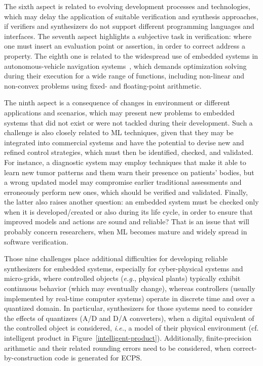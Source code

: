 \documentclass[format=acmsmall, review=false, screen=true]{acmart}
\begin{document}
The sixth aspect is related to evolving development processes and technologies, which may delay the application of suitable verification and synthesis approaches, if verifiers and synthesizers do not support different programming languages and interfaces. The seventh aspect highlights a subjective task in verification: where one must insert an evaluation point or assertion, in order to correct address a property. The eighth one is related to the widespread use of embedded systems in autonomous-vehicle navigation systems~\cite{Adouane16}, which demands optimization solving during their execution for a wide range of functions, including non-linear and non-convex problems using fixed- and floating-point arithmetic. 

The ninth aspect is a consequence of changes in environment or different applications and scenarios, which may present new problems to embedded systems that did not exist or were not tackled during their development. Such a challenge is also closely related to ML techniques, given that they may be integrated into commercial systems and have the potential to devise new and refined control strategies, which must then be identified, checked, and validated. For instance, a diagnostic system may employ techniques that make it able to learn new tumor patterns and them warn their presence on patients' bodies, but a wrong updated model may compromise earlier traditional assessments and erroneously perform new ones, which should be verified and validated. Finally, the latter also raises another question: an embedded system must be checked only when it is developed/created or also during its life cycle, in order to ensure that improved models and actions are sound and reliable? That is an issue that will probably concern researchers, when ML becomes mature and widely spread in software verification.

Those nine challenges place additional difficulties for developing reliable synthesizers for embedded systems, especially for cyber-physical systems and micro-grids, where controlled objects ({\it e.g.}, physical plants) typically exhibit continuous behavior (which may eventually change), whereas controllers (usually implemented by real-time computer systems) operate in discrete time and over a quantized domain. In particular, synthesizers for those systems need to consider the effects of quantizers (A/D and D/A converters), when a digital equivalent of the controlled object is considered, {\it i.e.}, a model of their physical environment (cf. intelligent product in Figure~\ref{intelligent-product}). Additionally,  finite-precision arithmetic and their related rounding errors need to be considered, when correct-by-construction code is generated for ECPS.
\end{document}
